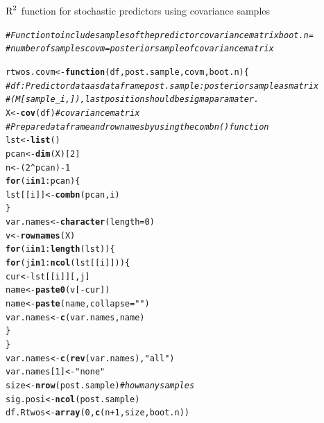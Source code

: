 \documentclass[11pt,a4paper,twoside]{book}\usepackage[]{graphicx}\usepackage[]{color}
\makeatletter
\newcommand{\hlnum}[1]{\textcolor[rgb]{0.686,0.059,0.569}{#1}}%
\newcommand{\hlstr}[1]{\textcolor[rgb]{0.192,0.494,0.8}{#1}}%
\newcommand{\hlcom}[1]{\textcolor[rgb]{0.678,0.584,0.686}{\textit{#1}}}%
\newcommand{\hlopt}[1]{\textcolor[rgb]{0,0,0}{#1}}%
\newcommand{\hlstd}[1]{\textcolor[rgb]{0.345,0.345,0.345}{#1}}%
\newcommand{\hlkwa}[1]{\textcolor[rgb]{0.161,0.373,0.58}{\textbf{#1}}}%
\newcommand{\hlkwb}[1]{\textcolor[rgb]{0.69,0.353,0.396}{#1}}%
\newcommand{\hlkwc}[1]{\textcolor[rgb]{0.333,0.667,0.333}{#1}}%
\newcommand{\hlkwd}[1]{\textcolor[rgb]{0.737,0.353,0.396}{\textbf{#1}}}%
\newenvironment{kframe}{%
 \def\at@end@of@kframe{}%
 \ifinner\ifhmode%
  \def\at@end@of@kframe{\end{minipage}}%
  \begin{minipage}{\columnwidth}%
 \fi\fi%
 \def\FrameCommand##1{\hskip\@totalleftmargin \hskip-\fboxsep
 \colorbox{shadecolor}{##1}\hskip-\fboxsep
     \hskip-\linewidth \hskip-\@totalleftmargin \hskip\columnwidth}%
 \MakeFramed {\advance\hsize-\width
   \@totalleftmargin\z@ \linewidth\hsize
   \@setminipage}}%
 {\par\unskip\endMakeFramed%
 \at@end@of@kframe}
\newenvironment{knitrout}{}{} %
\makeatother
\begin{document}
\begin{codeenv}

\caption{$\text{R}^2$ function for stochastic predictors using covariance samples}\label{r03:LMG.covm}
\begin{knitrout}
\color{fgcolor}\begin{kframe}
\begin{alltt}
\hlcom{# Function to include samples of the predictor covariance matrix boot.n =}
\hlcom{# number of samples covm = posterior sample of covariance matrix}

\hlstd{rtwos.covm} \hlkwb{<-} \hlkwa{function}\hlstd{(}\hlkwc{df}\hlstd{,} \hlkwc{post.sample}\hlstd{,} \hlkwc{covm}\hlstd{,} \hlkwc{boot.n}\hlstd{) \{}
    \hlcom{# df: Predictor data as data frame post.sample: posterior sample as matrix}
    \hlcom{# (M[sample_i,]), last position should be sigma paramater.}
    \hlstd{X} \hlkwb{<-} \hlkwd{cov}\hlstd{(df)}  \hlcom{#covariance matrix}
    \hlcom{# Prepare data frame and rownames by using the combn() function}
    \hlstd{lst} \hlkwb{<-} \hlkwd{list}\hlstd{()}
    \hlstd{pcan} \hlkwb{<-} \hlkwd{dim}\hlstd{(X)[}\hlnum{2}\hlstd{]}
    \hlstd{n} \hlkwb{<-} \hlstd{(}\hlnum{2}\hlopt{^}\hlstd{pcan)} \hlopt{-} \hlnum{1}
    \hlkwa{for} \hlstd{(i} \hlkwa{in} \hlnum{1}\hlopt{:}\hlstd{pcan) \{}
        \hlstd{lst[[i]]} \hlkwb{<-} \hlkwd{combn}\hlstd{(pcan, i)}
    \hlstd{\}}
    \hlstd{var.names} \hlkwb{<-} \hlkwd{character}\hlstd{(}\hlkwc{length} \hlstd{=} \hlnum{0}\hlstd{)}
    \hlstd{v} \hlkwb{<-} \hlkwd{rownames}\hlstd{(X)}
    \hlkwa{for} \hlstd{(i} \hlkwa{in} \hlnum{1}\hlopt{:}\hlkwd{length}\hlstd{(lst)) \{}
        \hlkwa{for} \hlstd{(j} \hlkwa{in} \hlnum{1}\hlopt{:}\hlkwd{ncol}\hlstd{(lst[[i]])) \{}
            \hlstd{cur} \hlkwb{<-} \hlstd{lst[[i]][, j]}
            \hlstd{name} \hlkwb{<-} \hlkwd{paste0}\hlstd{(v[}\hlopt{-}\hlstd{cur])}
            \hlstd{name} \hlkwb{<-} \hlkwd{paste}\hlstd{(name,} \hlkwc{collapse} \hlstd{=} \hlstr{" "}\hlstd{)}
            \hlstd{var.names} \hlkwb{<-} \hlkwd{c}\hlstd{(var.names, name)}
        \hlstd{\}}
    \hlstd{\}}
    \hlstd{var.names} \hlkwb{<-} \hlkwd{c}\hlstd{(}\hlkwd{rev}\hlstd{(var.names),} \hlstr{"all"}\hlstd{)}
    \hlstd{var.names[}\hlnum{1}\hlstd{]} \hlkwb{<-} \hlstr{"none"}
    \hlstd{size} \hlkwb{<-} \hlkwd{nrow}\hlstd{(post.sample)}  \hlcom{# how many samples}
    \hlstd{sig.posi} \hlkwb{<-} \hlkwd{ncol}\hlstd{(post.sample)}
    \hlstd{df.Rtwos} \hlkwb{<-} \hlkwd{array}\hlstd{(}\hlnum{0}\hlstd{,} \hlkwd{c}\hlstd{(n} \hlopt{+} \hlnum{1}\hlstd{, size, boot.n))}

\end{alltt}
\end{kframe}
\end{knitrout}
\end{codeenv}
\end{document}
